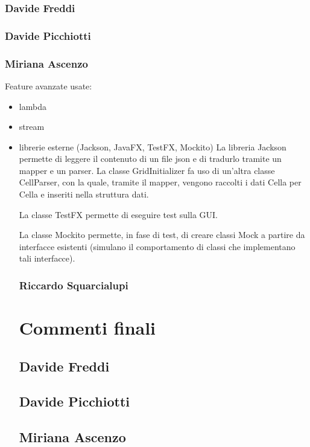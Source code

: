\documentclass[a4paper,12pt]{report}
\begin{document}
\subsection{Davide Freddi}
\subsection{Davide Picchiotti}
\subsection{Miriana Ascenzo}

Feature avanzate usate:
\begin{itemize}
    \item lambda
    \item stream
    \item librerie esterne (Jackson, JavaFX, TestFX, Mockito)
La libreria Jackson permette di leggere il contenuto di un file json e di tradurlo tramite un mapper e un parser.
%
La classe GridInitializer fa uso di un’altra classe CellParser, con la quale, tramite il mapper, vengono raccolti i dati Cella per Cella e inseriti nella struttura dati.

La classe TestFX permette di eseguire test sulla GUI.

La classe Mockito permette, in fase di test, di creare classi Mock a partire da interfacce esistenti (simulano il comportamento di classi che implementano tali interfacce).

\subsection{Riccardo Squarcialupi}

\chapter{Commenti finali}

\section{Davide Freddi}
\section{Davide Picchiotti}
\section{Miriana Ascenzo}


\end{itemize}
\end{document}
